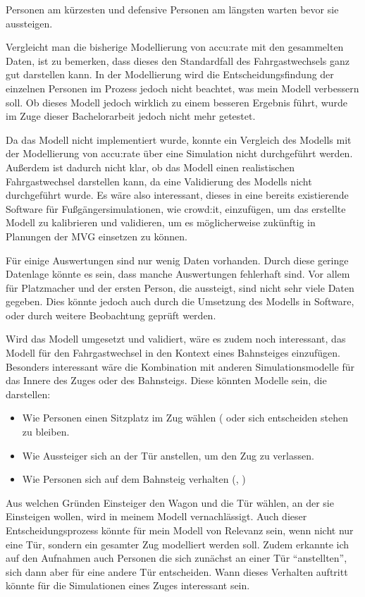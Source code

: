 Personen am kürzesten und defensive Personen am längsten warten bevor sie aussteigen.

Vergleicht man die bisherige Modellierung von accu:rate mit den gesammelten Daten, ist zu bemerken, dass dieses den Standardfall des Fahrgastwechsels ganz gut darstellen kann. In der Modellierung wird die Entscheidungsfindung der einzelnen Personen im Prozess jedoch nicht beachtet, was mein Modell verbessern soll. Ob dieses Modell jedoch wirklich zu einem besseren Ergebnis führt, wurde im Zuge dieser Bachelorarbeit jedoch nicht mehr getestet. 

Da das Modell nicht implementiert wurde, konnte ein Vergleich des Modells mit der Modellierung von accu:rate über eine Simulation nicht durchgeführt werden. Außerdem ist dadurch nicht klar, ob das Modell einen realistischen Fahrgastwechsel darstellen kann, da eine Validierung des Modells nicht durchgeführt wurde. Es wäre also interessant, dieses in eine bereits existierende Software für Fußgängersimulationen, wie crowd:it, einzufügen, um das erstellte Modell zu kalibrieren und validieren, um es möglicherweise zukünftig in Planungen der MVG einsetzen zu können.

Für einige Auswertungen sind nur wenig Daten vorhanden. Durch diese geringe Datenlage könnte es sein, dass manche Auswertungen fehlerhaft sind. Vor allem für Platzmacher und der ersten Person, die aussteigt, sind nicht sehr viele Daten gegeben. Dies könnte jedoch auch durch die Umsetzung des Modells in Software, oder durch weitere Beobachtung geprüft werden.

Wird das Modell umgesetzt und validiert, wäre es zudem noch interessant, das Modell für den Fahrgastwechsel in den Kontext eines Bahnsteiges einzufügen. Besonders interessant wäre die Kombination mit anderen Simulationsmodelle für das Innere des Zuges oder des Bahnsteigs. Diese könnten Modelle sein, die darstellen:
\begin{itemize}
\item Wie Personen einen Sitzplatz im Zug wählen (\cite{Schottl.2016} oder sich entscheiden stehen zu bleiben.
\item Wie Aussteiger sich an der Tür anstellen, um den Zug zu verlassen.
\item Wie Personen sich auf dem Bahnsteig verhalten (\cite{Davidich.2013}, \cite{Chen.2017})
\end{itemize}

Aus welchen Gründen Einsteiger den Wagon und die Tür wählen, an der sie Einsteigen wollen, wird in meinem Modell vernachlässigt. Auch dieser Entscheidungsprozess könnte für mein Modell von Relevanz sein, wenn nicht nur eine Tür, sondern ein gesamter Zug modelliert werden soll. Zudem erkannte ich auf den Aufnahmen auch Personen die sich zunächst an einer Tür "`anstellten"', sich dann aber für eine andere Tür entscheiden. Wann dieses Verhalten auftritt könnte für die Simulationen eines Zuges interessant sein.

